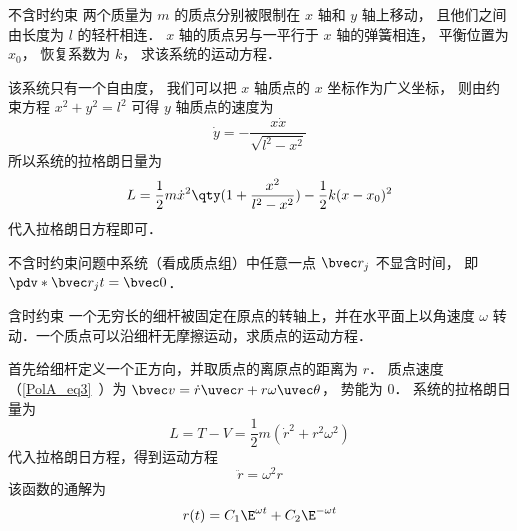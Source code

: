 \begin{example}{不含时约束}
两个质量为 $m$ 的质点分别被限制在 $x$ 轴和 $y$ 轴上移动， 且他们之间由长度为 $l$ 的轻杆相连． $x$ 轴的质点另与一平行于 $x$ 轴的弹簧相连， 平衡位置为 $x_0$， 恢复系数为 $k$， 求该系统的运动方程．%

该系统只有一个自由度， 我们可以把 $x$ 轴质点的 $x$ 坐标作为广义坐标， 则由约束方程 $x^2 + y^2 = l^2$ 可得 $y$ 轴质点的速度为
\begin{equation}
\dot y = -\frac{x\dot x}{\sqrt{l^2 - x^2}}
\end{equation}
所以系统的拉格朗日量为
\begin{equation}
L = \frac12 m \dot x^2\qty(1 + \frac{x^2}{l^2 - x^2}) - \frac12 k (x-x_0)^2
\end{equation}
代入拉格朗日方程即可．
\end{example}
不含时约束问题中系统（看成质点组）中任意一点 $\bvec r_j$ 不显含时间， 即 $\pdv*{\bvec r_j}{t} = \bvec 0$．

\begin{example}{含时约束}\label{Lagrng_ex3}
一个无穷长的细杆被固定在原点的转轴上，并在水平面上以角速度 $\omega$ 转动．一个质点可以沿细杆无摩擦运动，求质点的运动方程．

首先给细杆定义一个正方向，并取质点的离原点的距离为 $r$． 质点速度（\autoref{PolA_eq3}~）为 $\bvec v = \dot r \uvec r + r\omega \uvec\theta$， 势能为 0． 系统的拉格朗日量为
\begin{equation}
L = T - V = \frac12 m(\dot r^2 + r^2 \omega^2)
\end{equation}
代入拉格朗日方程，得到运动方程
\begin{equation}
\ddot r = \omega^2 r
\end{equation}
该函数的通解为%
\begin{equation}
r(t) = C_1 \E^{\omega t} + C_2 \E^{-\omega t}
\end{equation}
\end{example}

